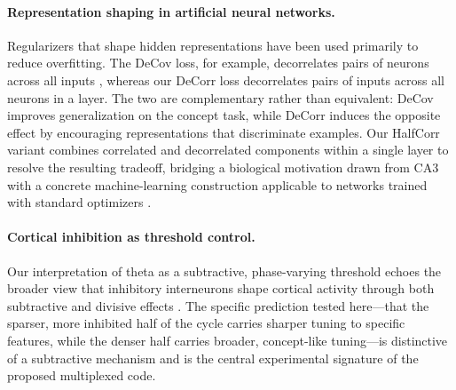 \paragraph{Representation shaping in artificial neural networks.} Regularizers that shape hidden representations have been used primarily to reduce overfitting. The DeCov loss, for example, decorrelates pairs of neurons across all inputs \cite{cogswell2016reducing}, whereas our DeCorr loss decorrelates pairs of inputs across all neurons in a layer. The two are complementary rather than equivalent: DeCov improves generalization on the concept task, while DeCorr induces the opposite effect by encouraging representations that discriminate examples. Our HalfCorr variant combines correlated and decorrelated components within a single layer to resolve the resulting tradeoff, bridging a biological motivation drawn from CA3 \cite{hopfield1982neural,schapiro2017complementary} with a concrete machine-learning construction applicable to networks trained with standard optimizers \cite{kingma2015adam,lecun2015deep}.

\paragraph{Cortical inhibition as threshold control.} Our interpretation of theta as a subtractive, phase-varying threshold echoes the broader view that inhibitory interneurons shape cortical activity through both subtractive and divisive effects \cite{isaacson2011inhibition}. The specific prediction tested here---that the sparser, more inhibited half of the cycle carries sharper tuning to specific features, while the denser half carries broader, concept-like tuning---is distinctive of a subtractive mechanism and is the central experimental signature of the proposed multiplexed code.
